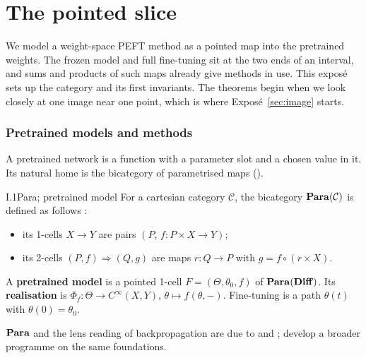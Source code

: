 \section{The pointed slice}\label{sec:slice}

We model a weight-space PEFT method as a pointed map into the pretrained weights. The frozen model and full fine-tuning sit
at the two ends of an interval, and sums and products of such maps already give methods in use. This exposé sets up the
category and its first invariants. The theorems begin when we look closely at one image near one point, which is where
Exposé~\ref{sec:image} starts.

\subsubsection{Pretrained models and methods}\label{sec:slice-methods}

A pretrained network is a function with a parameter slot and a chosen value in it. Its natural home is the bicategory of
parametrised maps ().

\begin{definition}{I.1}{Para; pretrained model}
For a cartesian category $\mathcal C$, the bicategory $\mathbf{Para}(\mathcal C)$ is defined as follows
\citep{fong2017backprop,cruttwell2021categorical}:
\begin{itemize}
  \item its 1-cells $X\to Y$ are pairs $(P,\,f:P\times X\to Y)$;
  \item its 2-cells $(P,f)\Rightarrow(Q,g)$ are maps $r:Q\to P$ with $g=f\circ(r\times X)$.
\end{itemize}
A \textbf{pretrained model} is a pointed 1-cell $F=(\Theta,\theta_0,f)$ of $\mathbf{Para}(\mathbf{Diff})$. Its \textbf{realisation} is
$\Phi_f:\Theta\to C^\infty(X,Y)$, $\theta\mapsto f(\theta,-)$. Fine-tuning is a path $\theta(t)$ with $\theta(0)=\theta_0$.
\end{definition}

$\mathbf{Para}$ and the lens reading of backpropagation are due to \citet{fong2017backprop} and \citet{cruttwell2021categorical};
\citet{gavranovic2024position} develop a broader programme on the same foundations.

